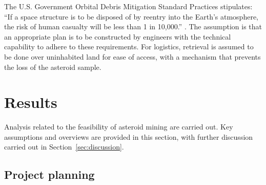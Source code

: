 \documentclass[conference]{IEEEtran}
\begin{document}
The U.S. Government Orbital Debris Mitigation Standard Practices stipulates: “If a space structure is to be disposed of by reentry into the Earth’s atmosphere, the risk of human casualty will be less than 1 in 10,000.” \cite{jet-propulsion-laboratory-2018}. The assumption is that an appropriate plan is to be constructed by engineers with the technical capability to adhere to these requirements. For logistics, retrieval is assumed to be done over uninhabited land for ease of access, with a mechanism that prevents the loss of the asteroid sample.

\section{Results}
Analysis related to the feasibility of asteroid mining are carried out. Key assumptions and overviews are provided in this section, with further discussion carried out in Section~\ref{sec:discussion}.

\subsection{Project planning}\label{sec:project}
\end{document}
